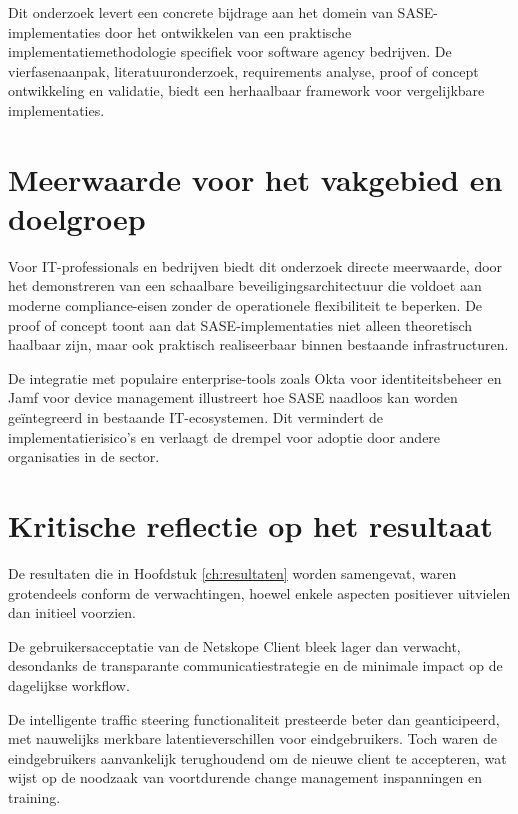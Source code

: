 Dit onderzoek levert een concrete bijdrage aan het domein van SASE-implementaties door het ontwikkelen van een praktische implementatiemethodologie specifiek voor software agency bedrijven. De vierfasenaanpak, literatuuronderzoek, requirements analyse, proof of concept ontwikkeling en validatie, biedt een herhaalbaar framework voor vergelijkbare implementaties.

\section{Meerwaarde voor het vakgebied en doelgroep}

Voor IT-professionals en bedrijven biedt dit onderzoek directe meerwaarde, door het demonstreren van een schaalbare beveiligingsarchitectuur die voldoet aan moderne compliance-eisen zonder de operationele flexibiliteit te beperken. De proof of concept toont aan dat SASE-implementaties niet alleen theoretisch haalbaar zijn, maar ook praktisch realiseerbaar binnen bestaande infrastructuren.

\vspace{2ex}

De integratie met populaire enterprise-tools zoals Okta voor identiteitsbeheer en Jamf voor device management illustreert hoe SASE naadloos kan worden geïntegreerd in bestaande IT-ecosystemen. Dit vermindert de implementatierisico's en verlaagt de drempel voor adoptie door andere organisaties in de sector.

\section{Kritische reflectie op het resultaat}

De resultaten die in Hoofdstuk \ref{ch:resultaten} worden samengevat, waren grotendeels conform de verwachtingen, hoewel enkele aspecten positiever uitvielen dan initieel voorzien. 

\vspace{2ex}

De gebruikersacceptatie van de Netskope Client bleek lager dan verwacht, desondanks de transparante communicatiestrategie en de minimale impact op de dagelijkse workflow. 

\vspace{2ex}

De intelligente traffic steering functionaliteit presteerde beter dan geanticipeerd, met nauwelijks merkbare latentieverschillen voor eindgebruikers. Toch waren de eindgebruikers aanvankelijk terughoudend om de nieuwe client te accepteren, wat wijst op de noodzaak van voortdurende change management inspanningen en training.


